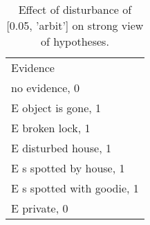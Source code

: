 \begin{table}\begin{tabular}{l}\toprule\multirow{2}{*}{Evidence} \\\\\midrule
no evidence, 0 & \\E object is gone, 1 & \\E broken lock, 1 & \\E disturbed house, 1 & \\E s spotted by house, 1 & \\E s spotted with goodie, 1 & \\E private, 0 & \\\bottomrule\end{tabular}\caption{Effect of disturbance of [0.05, 'arbit'] on strong view of hypotheses.}\end{table}